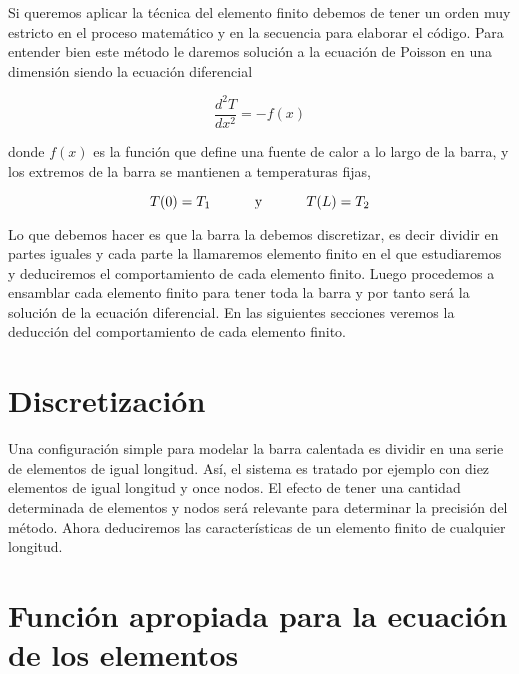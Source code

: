 \documentclass[10pt,a4paper]{article}
\begin{document}
\def\baselinestretch{1.66}
Si queremos aplicar la t\'ecnica del elemento finito debemos de tener un orden muy estricto en el proceso matem\'atico y en la secuencia para elaborar el c\'odigo. Para entender bien este m\'etodo le daremos soluci\'on a la ecuaci\'on de Poisson en una dimensi\'on siendo la ecuaci\'on diferencial

\begin{equation}\label{poisson}
  \frac{d^2T}{dx^2}=-f(x)
\end{equation}

\noindent donde $f(x)$ es la funci\'on que define una fuente de calor a lo largo de la barra, y los extremos de la barra se mantienen a temperaturas fijas,

$$T(0)=T_1 \hspace*{1.0cm} \mbox { y } \hspace*{1.0cm}  T(L)=T_2$$

Lo que debemos hacer es que la barra la debemos discretizar, es decir dividir en partes iguales y cada parte la llamaremos elemento finito en el que estudiaremos y deduciremos el comportamiento de cada elemento finito. Luego procedemos a ensamblar cada elemento finito para tener toda la barra y por tanto ser\'a la soluci\'on de la ecuaci\'on diferencial. En las siguientes secciones veremos la deducci\'on del comportamiento de cada elemento finito.

\section{Discretizaci\'on}
Una configuraci\'on simple para modelar la barra calentada es dividir en una serie de elementos de igual longitud. As\'i, el sistema es tratado por ejemplo con diez elementos de igual longitud y once nodos. El efecto de tener una cantidad determinada de elementos y nodos ser\'a relevante para determinar la precisi\'on del m\'etodo. Ahora deduciremos las caracter\'isticas de un elemento finito de cualquier longitud.

\section{Funci\'on apropiada para la ecuaci\'on de los elementos}
\end{document}
